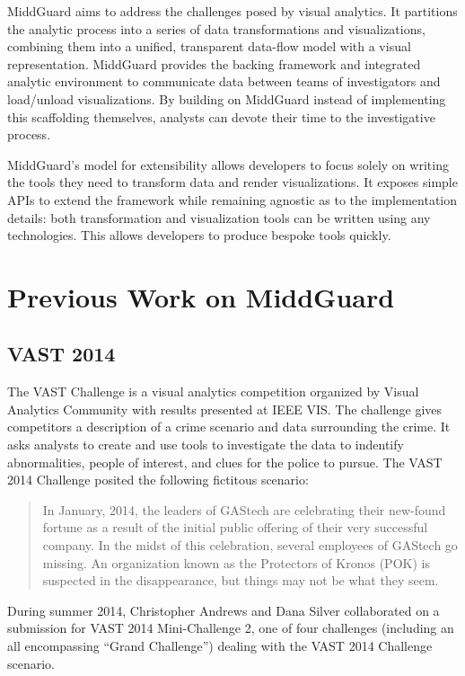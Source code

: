 \documentclass[midd]{thesis}
\begin{document}
MiddGuard aims to address the challenges posed by visual analytics. It
partitions the analytic process into a series of data transformations and
visualizations, combining them into a unified, transparent data-flow model with
a visual representation. MiddGuard provides the backing framework and integrated
analytic environment to communicate data between teams of investigators and
load/unload visualizations. By building on MiddGuard instead of implementing
this scaffolding themselves, analysts can devote their time to the investigative
process.

MiddGuard's model for extensibility allows developers to focus solely on writing
the tools they need to transform data and render visualizations. It exposes
simple APIs to extend the framework while remaining agnostic as to the
implementation details: both transformation and visualization tools can be
written using any technologies. This allows developers to produce bespoke tools
quickly.

\section{Previous Work on MiddGuard}

\subsection{VAST 2014}

The VAST Challenge is a visual analytics competition organized by Visual
Analytics Community with results presented at IEEE VIS. The challenge gives
competitors a description of a crime scenario and data surrounding the crime. It
asks analysts to create and use tools to investigate the data to indentify
abnormalities, people of interest, and clues for the police to pursue. The VAST
2014 Challenge \cite{vast2014} posited the following fictitous scenario:

\begin{quote}
In January, 2014, the leaders of GAStech are celebrating their new-found fortune
as a result of the initial public offering of their very successful company. In
the midst of this celebration, several employees of GAStech go missing. An
organization known as the Protectors of Kronos (POK) is suspected in the
disappearance, but things may not be what they seem.
\end{quote}

During summer 2014, Christopher Andrews and Dana Silver collaborated on a
submission for VAST 2014 Mini-Challenge 2, one of four challenges (including an
all encompassing ``Grand Challenge'') dealing with the VAST 2014 Challenge
scenario.
\end{document}

